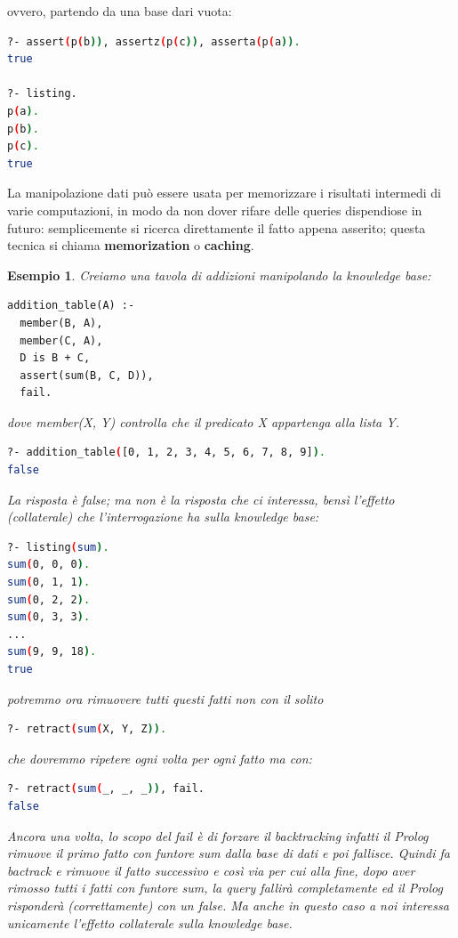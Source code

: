 \documentclass[a4paper]{report}
\newtheorem{esempio}{Esempio}
\begin{document}
ovvero, partendo da una base dari vuota:
\begin{shaded}
\begin{lstlisting}[language=bash]
?- assert(p(b)), assertz(p(c)), asserta(p(a)).
true

?- listing.
p(a).
p(b).
p(c).
true
\end{lstlisting}
\end{shaded}
La manipolazione dati può essere usata per memorizzare i risultati intermedi di varie computazioni, in modo da non dover rifare
delle queries dispendiose in futuro: semplicemente si ricerca direttamente il fatto appena asserito;
questa tecnica si chiama \textbf{memorization} o \textbf{caching}.
\begin{esempio}
Creiamo una tavola di addizioni manipolando la knowledge base:
\begin{verbatim}
addition_table(A) :-
  member(B, A),
  member(C, A),
  D is B + C,
  assert(sum(B, C, D)),
  fail.
\end{verbatim}
dove \textit{member(X, Y)} controlla che il predicato X appartenga alla lista Y.\\
\begin{shaded}
\begin{lstlisting}[language=bash]
?- addition_table([0, 1, 2, 3, 4, 5, 6, 7, 8, 9]).
false
\end{lstlisting}
\end{shaded}
La risposta è false; ma non è la risposta che ci interessa, bensì l’effetto (collaterale) che l’interrogazione ha sulla knowledge base:
\begin{shaded}
\begin{lstlisting}[language=bash]
?- listing(sum).
sum(0, 0, 0).
sum(0, 1, 1).
sum(0, 2, 2).
sum(0, 3, 3).
...
sum(9, 9, 18).
true
\end{lstlisting}
\end{shaded}
potremmo ora rimuovere tutti questi fatti non con il solito 
\begin{shaded}
\begin{lstlisting}[language=bash]
?- retract(sum(X, Y, Z)).
\end{lstlisting}
\end{shaded}
che dovremmo ripetere ogni volta per ogni fatto ma con:
\begin{shaded}
\begin{lstlisting}[language=bash]
?- retract(sum(_, _, _)), fail.
false
\end{lstlisting}
\end{shaded}
Ancora una volta, lo scopo del \emph{fail} è di forzare il backtracking infatti il Prolog rimuove il primo fatto con funtore sum dalla base di dati
e poi fallisce.\newline
Quindi fa bactrack e rimuove il fatto successivo e così via per cui alla fine, dopo aver rimosso tutti i fatti con funtore sum,
la query fallirà completamente ed il Prolog risponderà (correttamente) con un false.\newline
Ma anche in questo caso a noi interessa unicamente l’effetto collaterale sulla knowledge base.
\end{esempio}
\end{document}
